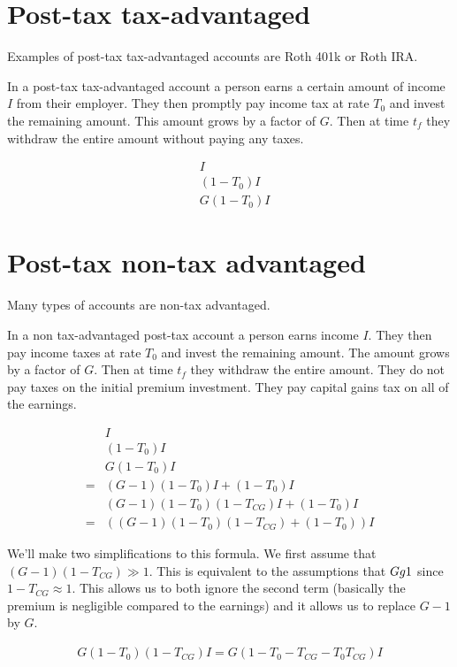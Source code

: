 \documentclass[12pt]{article}
\begin{document}
\section{Post-tax tax-advantaged}

Examples of post-tax tax-advantaged accounts are Roth 401k or Roth IRA.

In a post-tax tax-advantaged account a person earns a certain amount of income $I$ from their employer.
They then promptly pay income tax at rate $T_0$ and invest the remaining amount.
This amount grows by a factor of $G$.
Then at time $t_f$ they withdraw the entire amount without paying any taxes.

\begin{align}
&I\\
&(1-T_0)I\\
&G(1-T_0)I
\end{align}

\section{Post-tax non-tax advantaged}

Many types of accounts are non-tax advantaged.

In a non tax-advantaged post-tax account a person earns income $I$.
They then pay income taxes at rate $T_0$ and invest the remaining amount.
The amount grows by a factor of $G$.
Then at time $t_f$ they withdraw the entire amount. 
They do not pay taxes on the initial premium investment. 
They pay capital gains tax on all of the earnings.

\begin{align}
&I\\
&(1-T_0)I\\
&G(1-T_0)I\\ 
= &(G-1)(1-T_0)I + (1-T_0)I\\
&(G-1)(1-T_0)(1-T_{CG})I + (1-T_0)I\\
= &((G-1)(1-T_0)(1-T_{CG}) + (1-T_0))I
\end{align}

We'll make two simplifications to this formula. We first assume that $(G-1)(1-T_{CG}) \gg 1$.
This is equivalent to the assumptions that $G\\g1$ since $1-T_{CG} \approx 1$.
This allows us to both ignore the second term (basically the premium is negligible compared to the earnings) and it allows us to replace $G-1$ by $G$.

\begin{align}
G(1-T_0)(1-T_{CG})I = G(1 - T_0 - T_{CG} - T_0T_{CG})I
\end{align}
\end{document}
